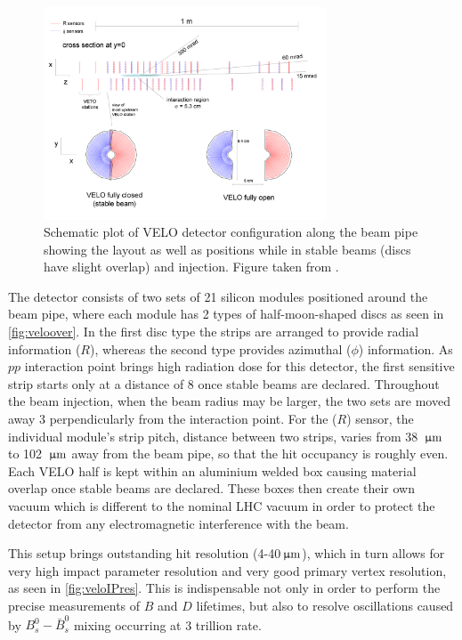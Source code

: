 \begin{figure}[!h]
	\centering
	\includegraphics[width = 0.75\textwidth]{figs/detector/veloOverview.png}
	\caption{ Schematic plot of \Gls{VELO} detector configuration along the beam pipe showing the layout as well as positions while in stable beams (discs have slight overlap) and injection. Figure taken from \cite{det_paper}.}
	\label{fig:veloover}
\end{figure}

The detector consists of two sets of 21 silicon modules positioned around the beam pipe, where each module has 2 types of half-moon-shaped discs as seen in \autoref{fig:veloover}. In the first disc type the strips are arranged to provide radial information ($R$), whereas the second type provides azimuthal ($\phi$) information. As $pp$ interaction point brings high radiation dose for this detector, the first sensitive strip starts only at a distance of 8 \mm once stable beams are declared. Throughout the beam injection, when the beam radius may be larger, the two sets are moved away 3 \cm perpendicularly from the interaction point. For the ($R$) sensor, the individual module's strip pitch, distance between two strips, varies from 38 ${\,\upmu\rm m}$ to 102 ${\,\upmu\rm m}$ away from the beam pipe, so that the hit occupancy is roughly even. Each \Gls{VELO} half is kept within an aluminium welded box causing material overlap once stable beams are declared. These boxes then create their own vacuum which is different to the nominal LHC vacuum in order to protect the detector from any electromagnetic interference with the beam. 

This setup brings outstanding hit resolution (4-40${\,\upmu\rm m}$), which in turn allows for very high impact parameter resolution and very good primary vertex resolution, as seen in \autoref{fig:veloIPres}. This is indispensable not only in order to perform the precise measurements of $B$ and $D$ lifetimes, but also to resolve oscillations caused by $B^{0}_{s}-\bar{B}^{0}_{s}$ mixing occurring at 3 trillion \hz rate.


